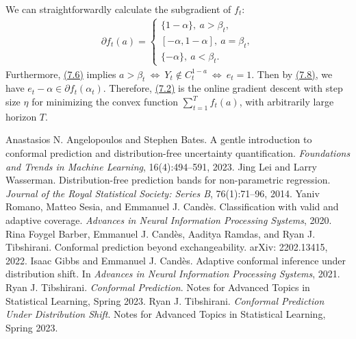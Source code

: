 \documentclass{article}
\numberwithin{equation}{section}
\begin{document}
We can straightforwardly calculate the subgradient of $f_t$:
\begin{align*}
	\partial f_t(a) = \begin{cases}
		\{1-\alpha\},\ a > \beta_t,\\
		[-\alpha,1-\alpha],\ a=\beta_t,\\
		\{-\alpha\},\ a < \beta_t.
	\end{cases}\tag{7.8}\label{7.8}
\end{align*}
Furthermore, \hyperref[7.6]{(7.6)} implies $a > \beta_t\ \Leftrightarrow\ Y_t\notin C_t^{1-a}\ \Leftrightarrow\ e_t = 1.$ Then by \hyperref[7.8]{(7.8)}, we have $e_t - \alpha\in\partial f_t(\alpha_t)$. Therefore, \hyperref[7.2]{(7.2)} is the online gradient descent with step size $\eta$ for minimizing the convex function $\sum_{t=1}^T f_t(a)$, with arbitrarily large horizon $T$.

\begin{thebibliography}{99}
 Anastasios N. Angelopoulos and Stephen Bates. A gentle introduction to conformal prediction and
distribution-free uncertainty quantification. \textit{Foundations and Trends in Machine Learning}, 16(4):494–591, 2023.
 Jing Lei and Larry Wasserman. Distribution-free prediction bands for non-parametric regression. \textit{Journal of the Royal Statistical Society: Series B}, 76(1):71–96, 2014.
 Yaniv Romano, Matteo Sesia, and Emmanuel J. Candès. Classification with valid and adaptive coverage.
\textit{Advances in Neural Information Processing Systems}, 2020.
 Rina Foygel Barber, Emmanuel J. Candès, Aaditya Ramdas, and Ryan J. Tibshirani. Conformal prediction
beyond exchangeability. arXiv: 2202.13415, 2022.
 Isaac Gibbs and Emmanuel J. Candès. Adaptive conformal inference under distribution shift. In \textit{Advances in Neural Information Processing Systems}, 2021.
 Ryan J. Tibshirani. \textit{Conformal Prediction}. Notes for Advanced Topics in Statistical Learning, Spring 2023.
 Ryan J. Tibshirani. \textit{Conformal Prediction Under Distribution Shift}. Notes for Advanced Topics in
Statistical Learning, Spring 2023.
\end{thebibliography}
\end{document}
